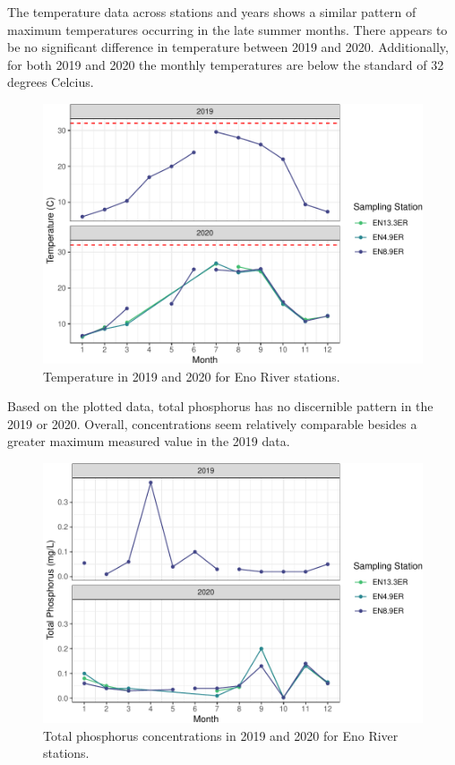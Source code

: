 \documentclass[
  12pt,
]{article}
\begin{document}
The temperature data across stations and years shows a similar pattern
of maximum temperatures occurring in the late summer months. There
appears to be no significant difference in temperature between 2019 and
2020. Additionally, for both 2019 and 2020 the monthly temperatures are
below the standard of 32 degrees Celcius.

\begin{figure}
\centering
\includegraphics{August_Lindborg_ENV872_Project_files/figure-latex/unnamed-chunk-8-1.pdf}
\caption{Temperature in 2019 and 2020 for Eno River stations.}
\end{figure}

Based on the plotted data, total phosphorus has no discernible pattern
in the 2019 or 2020. Overall, concentrations seem relatively comparable
besides a greater maximum measured value in the 2019 data.

\begin{figure}
\centering
\includegraphics{August_Lindborg_ENV872_Project_files/figure-latex/unnamed-chunk-9-1.pdf}
\caption{Total phosphorus concentrations in 2019 and 2020 for Eno River
stations.}
\end{figure}
\end{document}
